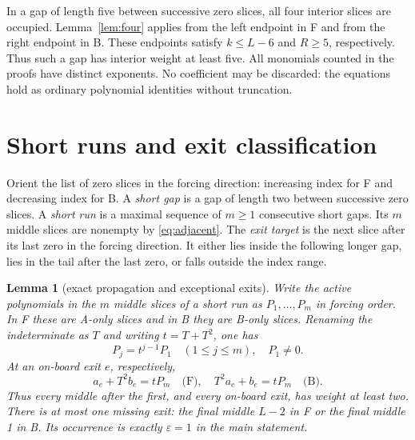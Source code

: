 \documentclass{article}
\newtheorem{lemma}{Lemma}
\begin{document}
In a gap of length five between successive zero slices, all four interior slices are occupied.
Lemma~\ref{lem:four} applies from the left endpoint in F and from the right endpoint in B. These
endpoints satisfy \(k \le L-6\) and \(R \ge 5\), respectively. Thus such a gap has interior weight
at least five. All monomials counted in the proofs have distinct exponents. No coefficient may be discarded: the equations hold as ordinary polynomial identities without truncation.

\section{Short runs and exit classification}\label{sec:runs}

Orient the list of zero slices in the forcing direction: increasing index for F and decreasing
index for B. A \emph{short gap} is a gap of length two between successive zero slices. A
\emph{short run} is a maximal sequence of \(m \ge 1\) consecutive short gaps. Its \(m\) middle
slices are nonempty by \eqref{eq:adjacent}. The \emph{exit target} is the next slice after its
last zero in the forcing direction. It either lies inside the following longer gap, lies in the
tail after the last zero, or falls outside the index range.

\begin{lemma}[exact propagation and exceptional exits]\label{lem:propagation}
  Write the active polynomials in the \(m\) middle slices of a short run as
  \(P_1, \dots, P_m\) in forcing order. In F these are A-only slices and in B they are B-only
  slices. Renaming the indeterminate as \(T\) and writing \(t = T + T^2\), one has
  \begin{equation}\label{eq:run-powers}
    P_j = t^{j-1} P_1 \quad (1 \le j \le m), \quad P_1 \ne 0.
  \end{equation}
  At an on-board exit \(e\), respectively,
  \begin{equation}\label{eq:exit-feed}
    a_e + T^2 b_e = t P_m \quad \text{(F)}, \quad
    T^2 a_e + b_e = t P_m \quad \text{(B)}.
  \end{equation}
  Thus every middle after the first, and every on-board exit, has weight at least two. There is
  at most one missing exit: the final middle \(L-2\) in F or the final middle 1 in B. Its occurrence is
  exactly \(\varepsilon = 1\) in the main statement.
\end{lemma}
\end{document}
